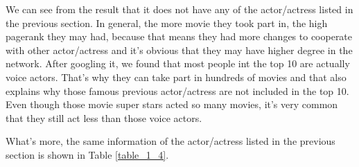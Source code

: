 \documentclass[11pt]{article}
\begin{document}
\begin{table}
\center
\caption{Top 10 highest pagerank score actor/actress}
\label{table_1_3}
\end{table}

We can see from the result that it does not have any of the actor/actress listed in the previous section. In general, the more movie they took part in, the high pagerank they may had, because that means they had more changes to cooperate with other actor/actress and it's obvious that they may have higher degree in the network. After googling it, we found that most people int the top 10 are actually voice actors. That's why they can take part in hundreds of movies and that also explains why those famous previous actor/actress are not included in the top 10. Even though those movie super stars acted so many movies, it's very common that they still act less than those voice actors.

What's more, the same information of the actor/actress listed in the previous section is shown in Table \ref{table_1_4}.

\begin{table}[h]
\center
\caption{The same information table for previous actor/actress}
\label{table_1_4}
\end{table}
\end{document}
